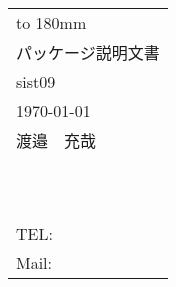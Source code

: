 ﻿\documentclass[uplatex]{jsarticle}
\renewcommand{\sistTitle}{sist09}%
\renewcommand{\Engtitle}{sist09}%
\renewcommand{\reportnumber}{}%
\renewcommand{\thesis}{パッケージ説明文書}%
\renewcommand{\edition}{(v1.0.0)}%
\renewcommand{\id}{}%
\renewcommand{\sistAuthor}{渡邉　充哉}%
\renewcommand{\Engauthor}{WATANABE Atsuya}%
\renewcommand{\freespace}{}
\renewcommand{\yearr}{2021}%
\renewcommand{\sistDate}{\today}%
\renewcommand{\organization}{~}
\renewcommand{\department}{~}%
\renewcommand{\Engdepartment}{}%
\renewcommand{\address}{}%
\renewcommand{\tel}{}%
\renewcommand{\mail}{}
\renewcommand{\editdata}{\sistDate}%
\begin{document}
\begin{table}[b]
\centering
\begin{tabular}{ll}
\vbox to 180mm{\vfill}	\\
\multicolumn{2}{l}{\small\thesis}	\\
\multicolumn{1}{l}{\Large\sistTitle}&	\\
\toprule
\editdata	\\
\sistAuthor\\
\organization	\\
\department	\\
\address	\\
TEL: \tel	\\ 
Mail: \href{mailto:mail}{\mail}	\\	\bottomrule
\end{tabular}
\end{table}
\renewcommand{\sistTitle}{sist09}%
\renewcommand{\Engtitle}{sist09}%
\renewcommand{\reportnumber}{}%
\renewcommand{\thesis}{スタイルファイル解説文書}%
\renewcommand{\edition}{v1.0.0}%
\renewcommand{\id}{}%
\renewcommand{\sistAuthor}{渡邉　充哉}%
\renewcommand{\Engauthor}{WATANABE Atsuya}%
\renewcommand{\freespace}{}
\renewcommand{\yearr}{2021}%
\renewcommand{\sistDate}{\today}%
\renewcommand{\organization}{~}
\renewcommand{\department}{~}%
\renewcommand{\Engdepartment}{}%
\renewcommand{\address}{}%
\renewcommand{\tel}{}%
\renewcommand{\mail}{}
\renewcommand{\editdata}{\sistDate}%

\end{document}
